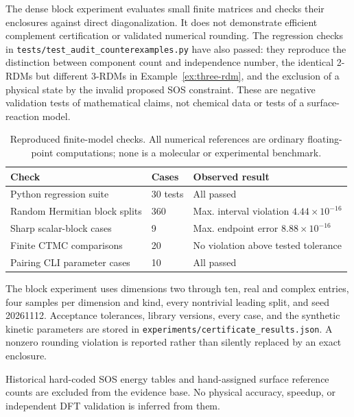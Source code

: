\documentclass[11pt,a4paper]{article}
\theoremstyle{plain}
\theoremstyle{definition}
\theoremstyle{remark}
\providecommand{\path}[1]{\texttt{#1}}
\begin{document}
The dense block experiment evaluates small finite matrices and checks their
enclosures against direct diagonalization. It does not demonstrate efficient
complement certification or validated numerical rounding. The regression
checks in \path{tests/test_audit_counterexamples.py} have also passed: they
reproduce the distinction between component count and independence number,
the identical 2-RDMs but different 3-RDMs in Example~\ref{ex:three-rdm},
and the exclusion of a physical state by the invalid proposed SOS constraint.
These are negative validation tests of mathematical claims, not chemical data
or tests of a surface-reaction model.

\begin{table}[ht]
\centering
\caption{Reproduced finite-model checks. All numerical references are ordinary
floating-point computations; none is a molecular or experimental benchmark.}
\begin{tabular}{lll}
\hline
Check & Cases & Observed result \\
\hline
Python regression suite & 30 tests & All passed \\
Random Hermitian block splits & 360 & Max. interval violation $4.44\times10^{-16}$ \\
Sharp scalar-block cases & 9 & Max. endpoint error $8.88\times10^{-16}$ \\
Finite CTMC comparisons & 20 & No violation above tested tolerance \\
Pairing CLI parameter cases & 10 & All passed \\
\hline
\end{tabular}
\label{tab:reproduced}
\end{table}
The block experiment uses dimensions two through ten, real and complex
entries, four samples per dimension and kind, every nontrivial leading
split, and seed 20261112. Acceptance tolerances, library versions, every
case, and the synthetic kinetic parameters are stored in
\path{experiments/certificate_results.json}. A nonzero rounding violation is
reported rather than silently replaced by an exact enclosure.

Historical hard-coded SOS energy tables and hand-assigned surface reference
counts are excluded from the evidence base. No physical accuracy, speedup, or
independent DFT validation is inferred from them.
\end{document}

